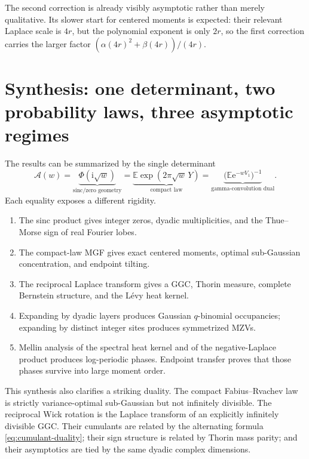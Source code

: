 \documentclass[11pt,oneside]{article}
\theoremstyle{definition}
\theoremstyle{remark}
\newcommand{\e}{\mathrm e}
\newcommand{\ii}{\mathrm i}
\newcommand{\E}{\mathbb E}
\begin{document}
The second correction is already visibly asymptotic rather than merely
qualitative.  Its slower start for centered moments is expected: their
relevant Laplace scale is $4r$, but the polynomial exponent is only $2r$, so
the first correction carries the larger factor
$(\alpha(4r)^2+\beta(4r))/(4r)$.

\section{Synthesis: one determinant, two probability laws, three asymptotic regimes}

The results can be summarized by the single determinant
\begin{equation}\label{eq:synthesis-A}
 \mathcal A(w)=
 \underbrace{\Phi(\ii\sqrt w)}_{\text{sinc/zero geometry}}
 =\underbrace{\E\exp(2\pi\sqrt w\,Y)}_{\text{compact law}}
 =\underbrace{\bigl(\E\e^{-wV_1}\bigr)^{-1}}_{\text{gamma-convolution dual}}.
\end{equation}
Each equality exposes a different rigidity.

\begin{enumerate}
\item The sinc product gives integer zeros, dyadic multiplicities, and the
      Thue--Morse sign of real Fourier lobes.
\item The compact-law MGF gives exact centered moments, optimal sub-Gaussian
      concentration, and endpoint tilting.
\item The reciprocal Laplace transform gives a GGC, Thorin measure, complete
      Bernstein structure, and the L\'evy heat kernel.
\item Expanding by dyadic layers produces Gaussian $q$-binomial occupancies;
      expanding by distinct integer sites produces symmetrized MZVs.
\item Mellin analysis of the spectral heat kernel and of the negative-Laplace
      product produces log-periodic phases.  Endpoint transfer proves that
      those phases survive into large moment order.
\end{enumerate}

This synthesis also clarifies a striking duality.  The compact Fabius--Rvachev
law is strictly variance-optimal sub-Gaussian but not infinitely divisible.
The reciprocal Wick rotation is the Laplace transform of an explicitly
infinitely divisible GGC.  Their cumulants are related by the alternating
formula \cref{eq:cumulant-duality}; their sign structure is related by Thorin
mass parity; and their asymptotics are tied by the same dyadic complex
dimensions.
\end{document}
